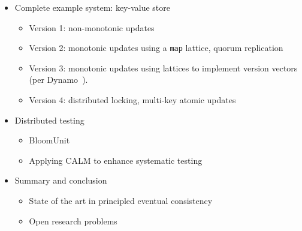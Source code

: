 \documentclass{sig-alternate}
\begin{document}
\begin{itemize}
\item
  Complete example system: key-value store
  \begin{itemize}
  \item
    Version 1: non-monotonic updates
  \item
    Version 2: monotonic updates using a \texttt{map} lattice, quorum
    replication
  \item
    Version 3: monotonic updates using lattices to implement version vectors
    (per Dynamo~\cite{DeCandia2007}).
  \item
    Version 4: distributed locking, multi-key atomic updates
  \end{itemize}
\item
  Distributed testing
  \begin{itemize}
  \item
    BloomUnit
  \item
    Applying CALM to enhance systematic testing
  \end{itemize}
\item
  Summary and conclusion
  \begin{itemize}
  \item
    State of the art in principled eventual consistency
  \item
    Open research problems
  \end{itemize}
\end{itemize}



\end{document}
